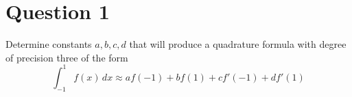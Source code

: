 \section{Question 1}

\begin{question}
    Determine constants $a,b,c,d$ that will produce a quadrature formula with degree of precision three of the form 
    \begin{equation}
        \int_{-1}^1 f(x) \, dx \approx af(-1)+bf(1)+cf'(-1)+df'(1)
    \end{equation}
\end{question}

\begin{answer}
    
\end{answer}